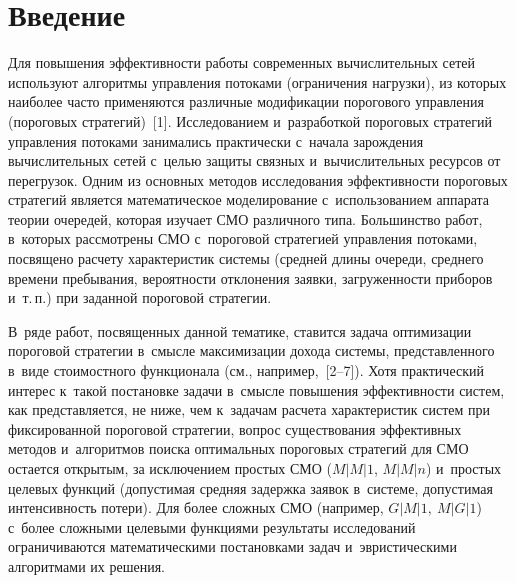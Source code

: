  



\thispagestyle{headings}

\begin{multicols}{2}

\label{st\stat}

\section{Введение}

\vspace*{-3pt}



Для повышения эффективности работы современных вычислительных
сетей используют алгоритмы управления потоками (ограничения
на\-грузки), из которых наиболее часто применяются различные
модификации порогового управления (пороговых стратегий)~[1].
Исследованием и~разработкой пороговых стратегий управления
потоками занимались практически с~начала зарождения вычислительных
сетей с~целью защиты связных и~вычислительных ресурсов от
перегрузок. Одним из основных методов исследования эф\-фек\-тив\-ности
пороговых стратегий  является математическое моделирование 
с~использованием аппарата теории очередей,
которая изучает СМО различного
типа. Большинство работ, в~которых рассмотрены СМО с~пороговой
стратегией управления потоками, посвящено расчету характеристик
системы (средней длины очереди, среднего времени пребывания,
вероятности отклонения заявки, загруженности приборов и~т.\,п.) при
заданной пороговой стратегии. 

В~ряде работ, посвященных данной
тематике, ставится задача оптимизации пороговой стратегии в~смысле
максимизации дохода системы, пред\-став\-лен\-но\-го в~виде стоимостного
функционала (см., например,~[2--7]). Хотя практический интерес 
к~такой постановке задачи в~смысле повышения эффективности сис\-тем,
как  пред\-став\-ля\-ет\-ся, не ниже, чем к~задачам расчета
характеристик систем при фиксированной пороговой стратегии, вопрос
существования эффективных методов и~алгоритмов поиска оптимальных
пороговых стратегий для СМО остается открытым, за исключением
простых СМО ($M|M|1$,  $M|M|n$) и~простых целевых функций
(допустимая средняя задержка заявок в~системе, допустимая
интенсивность потери). Для более сложных СМО (например, $G|M|1,\
M|G|1$) с~более сложными целевыми функциями результаты
исследований ограничиваются математическими постановками задач 
и~эвристическими алгоритмами их решения. 


\end{multicols}
